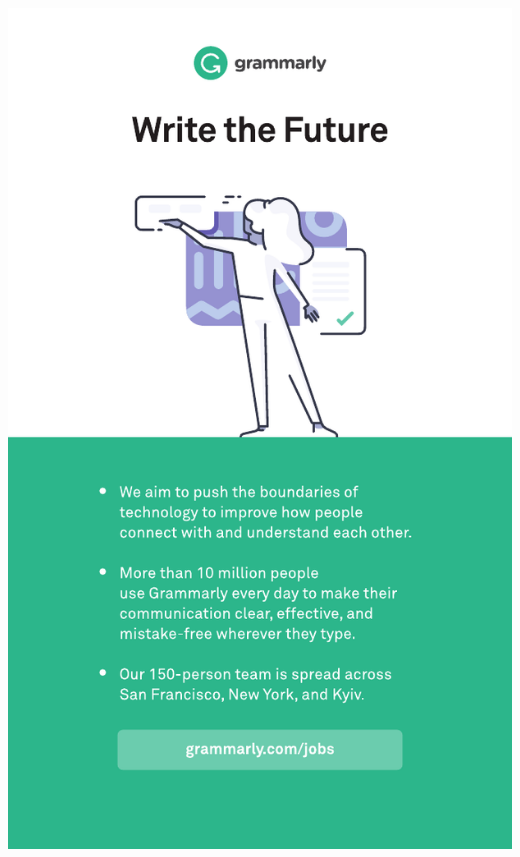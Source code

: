 \thispagestyle{empty}
\begin{center}
  \vfill
  \includegraphics[width=\textwidth]{content/ads/full/grammarly.pdf}
  \vfill
\end{center}
\clearpage
